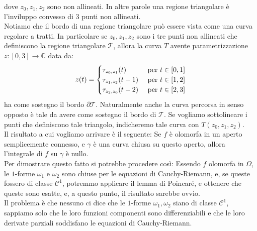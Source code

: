 \documentclass[11pt]{book}
\theoremstyle{Definizione}
\theoremstyle{TeoremaProposizioneLemmaCorollarioCongettura}
\theoremstyle{OsservazioneNotaEsempio}
\newcommand{\C}{\mathbb{C}}
\begin{document}
dove $z_0,z_1,z_2$ sono non allineati. In altre parole una regione triangolare è l'inviluppo convesso di $3$ punti non allineati.\\
Notiamo che il bordo di una regione triangolare può essere vista come una curva regolare a tratti. In particolare se $z_0,z_1,z_2$ sono i tre punti non allineati che definiscono la regione triangolare $\mathscr{T}$, allora la curva $T$ avente parametrizzazione $z:[0,3]\longrightarrow \C$ data da:
$$
z(t) = \begin{cases}
\tau_{z_0,z_1}(t) &\textup{ per }t\in [0,1]\\
\tau_{z_1,z_2}(t-1) &\textup{ per }t\in [1,2]\\
\tau_{z_2,z_0}(t-2) &\textup{ per }t\in [2,3]
\end{cases}
$$
ha come sostegno il bordo $\partial \mathscr{T}$. Naturalmente anche la curva percorsa in senso opposto è tale da avere come sostegno il bordo di $\mathscr{T}$. Se vogliamo sottolineare i punti che definiscono tale triangolo, indicheremo tale curva con $T(z_0,z_1,z_2)$.\\
Il risultato a cui vogliamo arrivare è il seguente: Se $f$ è olomorfa in un aperto semplicemente connesso, e $\gamma$ è una curva chiusa su questo aperto, allora l'integrale di $f$ su $\gamma$ è nullo.\\
Per dimostrare questo fatto si potrebbe procedere così: Essendo $f$ olomorfa in $\Omega$, le $1$-forme $\omega_1$ e $\omega_2$ sono chiuse per le equazioni di Cauchy-Riemann, e, se queste fossero di classe $\mathscr{C}^1$, potremmo applicare il lemma di Poincaré, e ottenere che queste sono esatte, e, a questo punto, il risultato sarebbe ovvio.\\
Il problema è che nessuno ci dice che le $1$-forme $\omega_1,\omega_2$ siano di classe $\mathscr{C}^1$, sappiamo solo che le loro funzioni componenti sono differenziabili e che le loro derivate parziali soddisfano le equazioni di Cauchy-Riemann.
\end{document}
